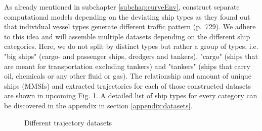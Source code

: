 As already mentioned in subchapter \ref{subchap:curveEnv}, \cite{venskus2021unsupervised} construct separate computational models depending on the deviating ship types as they found out that individual vessel types generate different traffic pattern (p.~729). We adhere to this idea and will assemble multiple datasets depending on the different ship categories. Here, we do not split by distinct types but rather a group of types, i.e. "big ships" (cargo- and passenger ships, dredgers and tankers), "cargo" (ships that are meant for transportation excluding tankers) and "tankers" (ships that carry oil, chemicals or any other fluid or gas). The relationship and amount of unique ships (MMSIs) and extracted trajectories for each of those constructed datasets are shown in upcoming Fig. \ref{fig:datasets}. A detailed list of ship types for every category can be discovered in the appendix in section \ref{appendix:datasets}.
\begin{figure}[H]
    \centering
    \hspace*{1cm}%
    \caption{Different trajectory datasets}
    \label{fig:datasets}
\end{figure}
